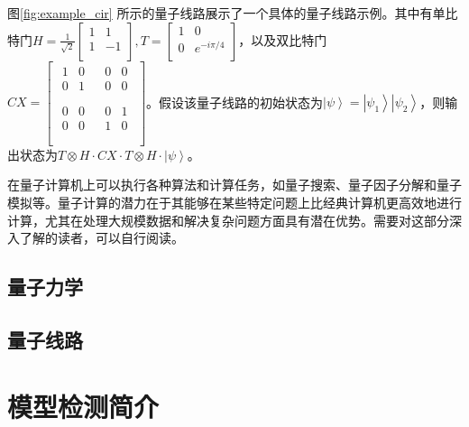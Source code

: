 图\ref{fig:example_cir} 所示的量子线路展示了一个具体的量子线路示例。其中有单比特门\(H=\frac{1}{\sqrt2}\left[\begin{matrix}1&1\\1&-1\\\end{matrix}\right],T=\left[\begin{matrix}1&0\\0&e^{-i\pi/4}\\\end{matrix}\right]\)，以及双比特门\(CX=\left[\begin{matrix}\begin{matrix}1&0\\0&1\\\end{matrix}&\begin{matrix}0&0\\0&0\\\end{matrix}\\\begin{matrix}0&0\\0&0\\\end{matrix}&\begin{matrix}0&1\\1&0\\\end{matrix}\\\end{matrix}\right]\)。假设该量子线路的初始状态为\(\left|\psi\right\rangle=\left|\psi_1\right\rangle\left|\psi_2\right\rangle\)，则输出状态为\(T\otimes H\cdot CX\cdot T\otimes H\cdot\left|\psi\right\rangle\)。

在量子计算机上可以执行各种算法和计算任务，如量子搜索\citep{Grover_1996}、量子因子分解\citep{Shor}和量子模拟\citep{Feynman}等。量子计算的潜力在于其能够在某些特定问题上比经典计算机更高效地进行计算，尤其在处理大规模数据和解决复杂问题方面具有潜在优势。需要对这部分深入了解的读者，可以自行阅读\citep{nielsen2010quantum}。

\subsection{量子力学}
\subsection{量子线路}
\section{模型检测简介}
